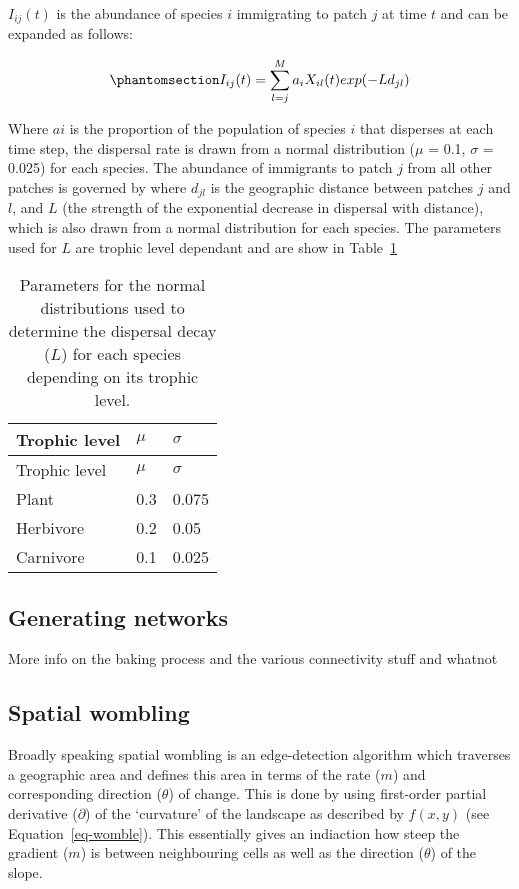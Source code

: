 \documentclass[
]{agujournal2019}
\begin{document}
\(I_{ij}(t)\) is the abundance of species \(i\) immigrating to patch
\(j\) at time \(t\) and can be expanded as follows:

\begin{equation}\phantomsection\label{eq-metacomm_imm}{
I_{ij}(t)=\sum_{l=j}^{M}a_iX_{il}(t)exp(-Ld_{jl})
}\end{equation}

Where \(ai\) is the proportion of the population of species \(i\) that
disperses at each time step, the dispersal rate is drawn from a normal
distribution (\(\mu\) = 0.1, \(\sigma\) = 0.025) for each species. The
abundance of immigrants to patch \(j\) from all other patches is
governed by where \(d_{jl}\) is the geographic distance between patches
\(j\) and \(l\), and \(L\) (the strength of the exponential decrease in
dispersal with distance), which is also drawn from a normal distribution
for each species. The parameters used for \(L\) are trophic level
dependant and are show in Table~\ref{tbl-interaction_decay}

\begin{longtable}[]{@{}lll@{}}
\caption{Parameters for the normal distributions used to determine the
dispersal decay (\(L\)) for each species depending on its trophic
level.}\label{tbl-interaction_decay}\tabularnewline
\toprule\noalign{}
Trophic level & \(\mu\) & \(\sigma\) \\
\midrule\noalign{}
\endfirsthead
\toprule\noalign{}
Trophic level & \(\mu\) & \(\sigma\) \\
\midrule\noalign{}
\endhead
\bottomrule\noalign{}
\endlastfoot
Plant & 0.3 & 0.075 \\
Herbivore & 0.2 & 0.05 \\
Carnivore & 0.1 & 0.025 \\
\end{longtable}

\subsection{Generating networks}\label{generating-networks}

More info on the baking process and the various connectivity stuff and
whatnot

\subsection{Spatial wombling}\label{spatial-wombling}

Broadly speaking spatial wombling is an edge-detection algorithm which
traverses a geographic area and defines this area in terms of the rate
(\(m\)) and corresponding direction (\(\theta\)) of change. This is done
by using first-order partial derivative (\(\partial\)) of the
`curvature' of the landscape as described by \(f(x,y)\) (see
Equation~\ref{eq-womble}). This essentially gives an indiaction how
steep the gradient (\(m\)) is between neighbouring cells as well as the
direction (\(\theta\)) of the slope.
\end{document}
